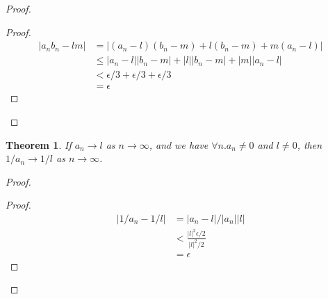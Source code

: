\documentclass{article}
\let\qed\relax
\newtheorem{theorem}[axiom]{Theorem}
\theoremstyle{definition}
\begin{document}
    \begin{proof}
        \pf
        \begin{proof}
            \pf
            \begin{align*}
                |a_n b_n - lm| & = |(a_n - l) (b_n - m) + l(b_n - m) + m(a_n - l)| \\
                & \leq |a_n - l| |b_n - m| + |l| |b_n - m| + |m| |a_n - l| \\
                & < \epsilon / 3 + \epsilon / 3 + \epsilon / 3 \\
                & = \epsilon
            \end{align*}
        \end{proof}
        \qed
    \end{proof}

    \begin{theorem}
        If $a_n \rightarrow l$ as $n \rightarrow \infty$, and we have $\forall n. a_n \neq 0$ and $l \neq 0$,
        then $1/a_n \rightarrow 1/l$ as $n \rightarrow \infty$.
    \end{theorem}

    \begin{proof}
        \pf
        \begin{proof}
            \pf
            \begin{align*}
                |1/a_n - 1/l| & = |a_n - l| / |a_n||l| \\
                & < \frac{|l|^2 \epsilon / 2}{|l|^2 / 2} \\
                & = \epsilon
            \end{align*}
        \end{proof}
        \qed
    \end{proof}
\end{document}

